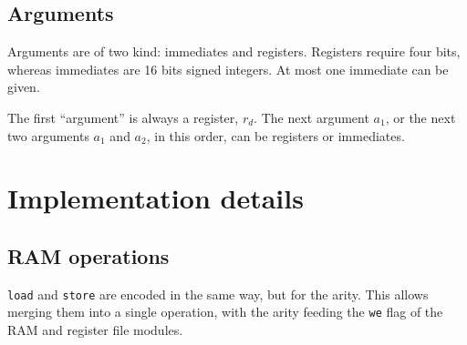 \documentclass{scrartcl}
\begin{document}
\subsection*{Arguments}
Arguments are of two kind: immediates and registers. Registers require four bits,
whereas immediates are 16 bits signed integers. At most one immediate can be
given.\par
The first ``argument'' is always a register, $r_d$. The next argument $a_1$, or
the next two arguments $a_1$ and $a_2$, in this order, can be registers or
immediates.

\section*{Implementation details}
\subsection*{RAM operations}
\verb|load| and \verb|store| are encoded in the same way, but for the arity. This
allows merging them into a single operation, with the arity feeding the \verb|we|
flag of the RAM and register file modules.
\end{document}
